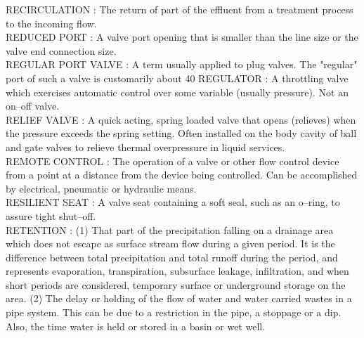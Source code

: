 \vspace{0.15cm}
RECIRCULATION :  The return of part of the effluent from a treatment process to the incoming flow.\\
\vspace{0.15cm}
REDUCED PORT :   A valve port opening that is smaller than the line size or the valve end connection size.\\
\vspace{0.15cm}
REGULAR PORT VALVE :   A term usually applied to plug valves. The "regular" port of such a valve is customarily about 40%
\vspace{0.15cm}
REGULATOR :   A throttling valve which exercises automatic control over some variable (usually pressure). Not an on–off valve.\\
\vspace{0.15cm}
RELIEF VALVE :   A quick acting, spring loaded valve that opens (relieves) when the pressure exceeds the spring setting. Often installed on the body cavity of ball and gate valves to relieve thermal overpressure in liquid services.\\
\vspace{0.15cm}
REMOTE CONTROL :   The operation of a valve or other flow control device from a point at a distance from the device being controlled. Can be accomplished by electrical, pneumatic or hydraulic means.\\
\vspace{0.15cm}
RESILIENT SEAT :   A valve seat containing a soft seal, such as an o–ring, to assure tight shut–off.\\
\vspace{0.15cm}
RETENTION :  (1) That part of the precipitation falling on a drainage area which does not escape as surface stream flow during a given period. It is the difference between total precipitation and total runoff during the period, and represents evaporation, transpiration, subsurface leakage, infiltration, and when short periods are considered, temporary surface or underground storage on the area. (2) The delay or holding of the flow of water and water carried wastes in a pipe system. This can be due to a restriction in the pipe, a stoppage or a dip. Also, the time water is held or stored in a basin or wet well. \\
